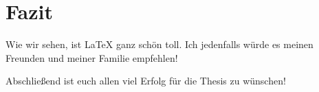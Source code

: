 \newpage
\section{Fazit}
Wie wir sehen, ist \LaTeX{} ganz schön toll. Ich jedenfalls würde es meinen Freunden und meiner Familie empfehlen!

Abschließend ist euch allen viel Erfolg für die Thesis zu wünschen!

